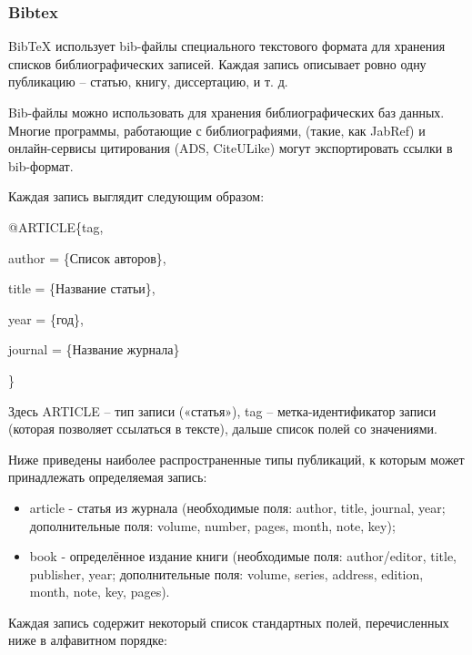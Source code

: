 \subsubsection*{Bibtex}

BibTeX использует bib-файлы специального текстового формата для хранения списков библиографических записей. Каждая запись описывает ровно одну публикацию -- статью, книгу, диссертацию, и т. д.

Bib-файлы можно использовать для хранения библиографических баз данных. Многие программы, работающие с библиографиями, (такие, как JabRef) и онлайн-сервисы цитирования (ADS, CiteULike) могут экспортировать ссылки в bib-формат.

Каждая запись выглядит следующим образом:

@ARTICLE\{tag, \par
	author = \{Список авторов\}, \par
	title = \{Название статьи\}, \par
	year = \{год\}, \par
	journal = \{Название журнала\} \par
\} \par

Здесь ARTICLE -- тип записи («статья»), tag -- метка-идентификатор записи (которая позволяет ссылаться в тексте), дальше список полей со значениями.

Ниже приведены наиболее распространенные типы публикаций, к которым может принадлежать определяемая запись:

\begin{itemize}
\item article - статья из журнала (необходимые поля: author, title, journal, year; дополнительные поля: volume, number, pages, month, note, key);
\item book - определённое издание книги (необходимые поля: author/editor, title, publisher, year; дополнительные поля: volume, series, address, edition, month, note, key, pages).
\end{itemize}

Каждая запись содержит некоторый список стандартных полей, перечисленных ниже в алфавитном порядке:

